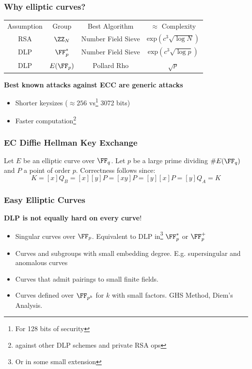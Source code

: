 \documentclass{beamer}
\begin{document}
\begin{frame}
    \frametitle{Why elliptic curves?}
    \begin{center}
        \begin{tabular}{c c c c}
            Assumption & Group   & Best Algorithm & $\approx$ Complexity \\
            RSA        & $\ZZ_N$ & Number Field Sieve & $\mathrm{exp}(c ^3\sqrt{\log N})$ \\
            DLP        & $\FF^*_p$ & Number Field Sieve & $\mathrm{exp}(c ^3\sqrt{\log p})$ \\
            DLP        & $E(\FF_p)$ & Pollard Rho & $\sqrt{p}$ \\
        \end{tabular}
    \end{center}
    \textbf{Best known attacks against ECC are generic attacks}
    \begin{itemize}
        \item Shorter keysizes ($\approx 256$ vs\footnote{For 128 bits of security} 3072 bits)
        \item Faster computation\footnote{against other DLP schemes and private RSA ops}
    \end{itemize}
\end{frame}

\begin{frame}
    \frametitle{EC Diffie Hellman Key Exchange}
    Let $E$ be an elliptic curve over $\FF_q$. Let $p$ be a large prime dividing $\#E(\FF_q)$ and $P$ a point of order $p$. 
    Correctness follows since:
    \[ K = [x]Q_B = [x][y]P = [xy]P = [y][x]P = [y]Q_A = K \]

\end{frame}

\begin{frame}
    \frametitle{Easy Elliptic Curves}
    \textbf{DLP is not equally hard on every curve}!
    \begin{itemize}
        \item Singular curves over $\FF_p$. Equivalent to DLP in\footnote{Or in some small extension} $\FF_p^*$ or $\FF_p^+$
        \item Curves and subgroups with small embedding degree. E.g. supersingular and anomalous curves
        \item Curves that admit pairings to small finite fields.
        \item Curves defined over $\FF_{p^k}$ for $k$ with small factors. GHS Method, Diem's Analysis.
    \end{itemize}
\end{frame}
\end{document}
